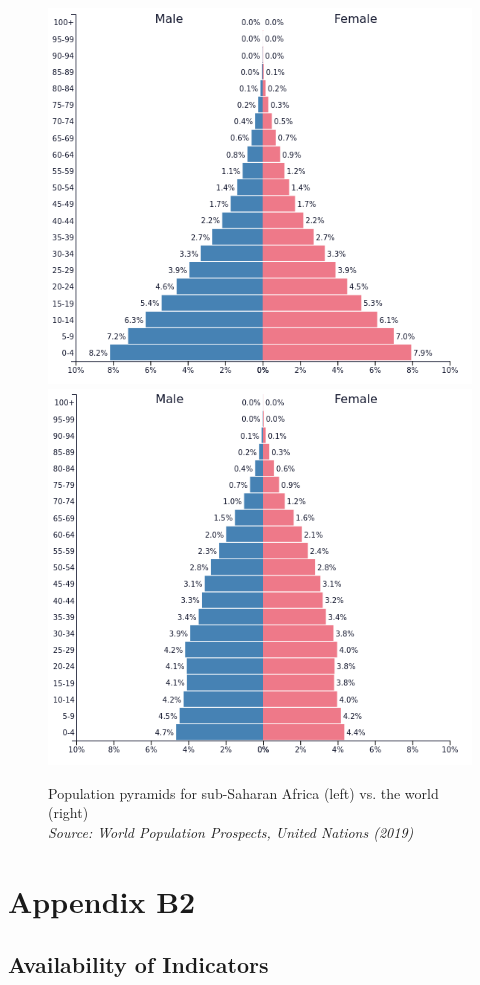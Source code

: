 \documentclass[
  a4paper, twoside, 12pt]{book}
\begin{document}
\begin{figure}[H]

{\centering \includegraphics[width=0.43\linewidth,]{figures/pp_ssa} \includegraphics[width=0.43\linewidth,]{figures/pp_world} 

}

\caption[Population pyramids for sub-Saharan Africa]{Population pyramids for sub-Saharan Africa (left) vs. the world (right) \\ \textit{\footnotesize{Source: World Population Prospects, United Nations (2019)}}}\label{fig:fig-pyramids}
\end{figure}

\newpage

\hypertarget{appendix-b}{%
\section*{Appendix B2}\label{appendix-b}}


\setcounter{figure}{0}
\renewcommand{\thefigure}{B2.\arabic{figure}}
\setcounter{table}{0}
\renewcommand{\thetable}{B2.\arabic{table}}

\hypertarget{availability}{%
\subsection*{Availability of Indicators}\label{availability}}
\end{document}
